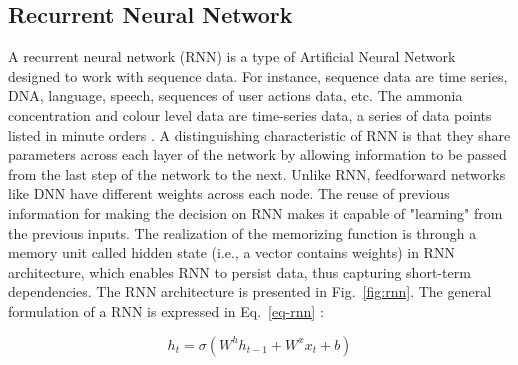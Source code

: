 
\subsection{Recurrent Neural Network}
A recurrent neural network (RNN) is a type of Artificial Neural Network designed to work with sequence data. For instance, sequence data are time series, DNA, language, speech, sequences of user actions data, etc. The ammonia concentration and colour level data are time-series data, a series of data points listed in minute orders \citep{dongesGuideRNNUnderstanding2021}. A distinguishing characteristic of RNN is that they share parameters across each layer of the network by allowing information to be passed from the last step of the network to the next. Unlike RNN, feedforward networks like DNN have different weights across each node. The reuse of previous information for making the decision on RNN makes it capable of "learning" from the previous inputs. The realization of the memorizing function is through a memory unit called hidden state (i.e., a vector contains weights) in RNN architecture, which enables RNN to persist data, thus capturing short-term dependencies. The RNN architecture is presented in Fig.~\ref{fig:rnn}. The general formulation of a RNN is expressed in Eq.~\ref{eq-rnn} \citep{mamandipoorMonitoringDetectingFaults2020}:

\begin{equation}\label{eq-rnn}
  h_t=\sigma(W^hh_{t-1}+W^xx_t+b)
\end{equation}

